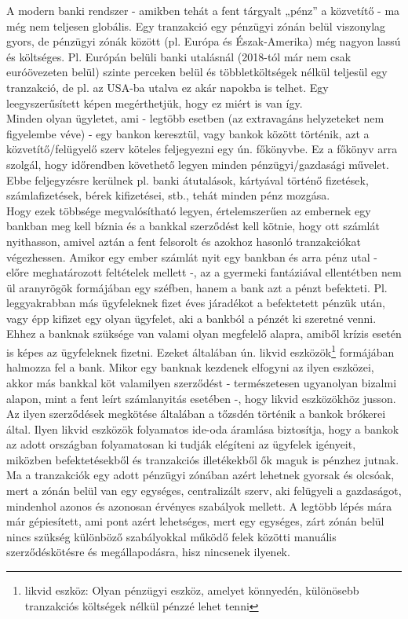 \documentclass[11pt,a4paper]{article}
\newcommand{\q}[1]{„#1''} %
\begin{document}
\noindent A modern banki rendszer - amikben tehát a fent tárgyalt \q{pénz} a közvetítő - ma még nem teljesen globális. Egy tranzakció egy pénzügyi zónán belül viszonylag gyors, de pénzügyi zónák között (pl. Európa és Észak-Amerika) még nagyon lassú és költséges. Pl. Európán belüli banki utalásnál (2018-tól már nem csak euróövezeten belül) szinte perceken belül és többletköltségek nélkül teljesül egy tranzakció, de pl. az USA-ba utalva ez akár napokba is telhet. Egy leegyszerűsített képen megérthetjük, hogy ez miért is van így. \\
Minden olyan ügyletet, ami - legtöbb esetben (az extravagáns helyzeteket nem figyelembe véve) - egy bankon keresztül, vagy bankok között történik, azt a közvetítő/felügyelő szerv köteles feljegyezni egy ún. főkönyvbe. Ez a főkönyv arra szolgál, hogy időrendben követhető legyen minden pénzügyi/gazdasági művelet. Ebbe feljegyzésre kerülnek pl. banki átutalások, kártyával történő fizetések, számlafizetések, bérek kifizetései, stb., tehát minden pénz mozgása. \\
Hogy ezek többsége megvalósítható legyen, értelemszerűen az embernek egy bankban meg kell bíznia és a bankkal szerződést kell kötnie, hogy ott számlát nyithasson, amivel aztán a fent felsorolt és azokhoz hasonló tranzakciókat végezhessen. Amikor egy ember számlát nyit egy bankban és arra pénz utal - előre meghatározott feltételek mellett -, az a gyermeki fantáziával ellentétben nem ül aranyrögök formájában egy széfben, hanem a bank azt a pénzt befekteti. Pl. leggyakrabban más ügyfeleknek fizet éves járadékot a befektetett pénzük után, vagy épp kifizet egy olyan ügyfelet, aki a bankból a pénzét ki szeretné venni. Ehhez a banknak szüksége van valami olyan megfelelő alapra, amiből krízis esetén is képes az ügyfeleknek fizetni. Ezeket általában ún. likvid eszközök\footnote{likvid eszköz: Olyan pénzügyi eszköz, amelyet könnyedén, különösebb tranzakciós költségek nélkül pénzzé lehet tenni} formájában halmozza fel a bank. Mikor egy banknak kezdenek elfogyni az ilyen eszközei, akkor más bankkal köt valamilyen szerződést - természetesen ugyanolyan bizalmi alapon, mint a fent leírt számlanyitás esetében -, hogy likvid eszközökhöz jusson. Az ilyen szerződések megkötése általában a tőzsdén történik a bankok brókerei által. Ilyen likvid eszközök folyamatos ide-oda áramlása biztosítja, hogy a bankok az adott országban folyamatosan ki tudják elégíteni az ügyfelek igényeit, miközben befektetésekből és tranzakciós illetékekből ők maguk is pénzhez jutnak. \\
Ma a tranzakciók egy adott pénzügyi zónában azért lehetnek gyorsak és olcsóak, mert a zónán belül van egy egységes, centralizált szerv, aki felügyeli a gazdaságot, mindenhol azonos és azonosan érvényes szabályok mellett. A legtöbb lépés mára már gépiesített, ami pont azért lehetséges, mert egy egységes, zárt zónán belül nincs szükség különböző szabályokkal működő felek közötti manuális szerződéskötésre és megállapodásra, hisz nincsenek ilyenek.
\end{document}
